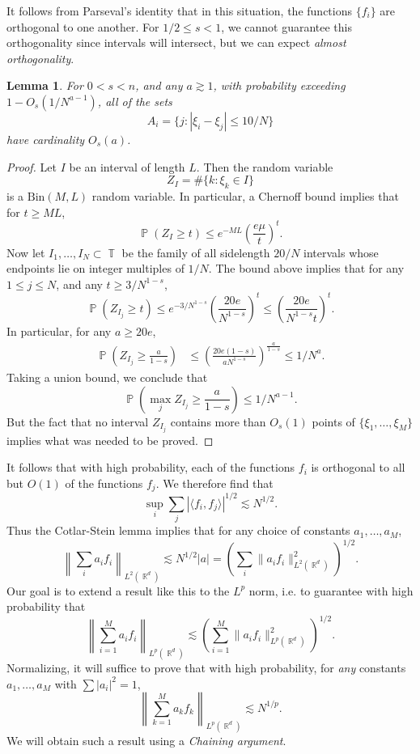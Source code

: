 \documentclass[dvipsnames,letterpaper,12pt]{article}
\numberwithin{equation}{section}
\DeclareMathOperator{\RR}{\mathbb{R}}
\DeclareMathOperator{\TT}{\mathbb{T}}
\newtheorem{lemma}[theorem]{Lemma}
\numberwithin{theorem}{section}
\DeclareMathOperator{\PP}{\mathbb{P}}
\begin{document}
It follows from Parseval's identity that in this situation, the functions $\{ f_i \}$ are orthogonal to one another. For $1/2 \leq s < 1$, we cannot guarantee this orthogonality since intervals will intersect, but we can expect \emph{almost orthogonality}.

\begin{lemma}
    For $0 < s < n$, and any $a \gtrsim 1$, with probability exceeding $1 - O_s(1/N^{a-1})$, all of the sets
    \[ A_i = \{ j : |\xi_i - \xi_j| \leq 10/N \} \]
    have cardinality $O_s(a)$.
\end{lemma}
\begin{proof}
    Let $I$ be an interval of length $L$. Then the random variable
    \[ Z_I = \# \{ k: \xi_k \in I \} \]
    is a $\text{Bin}(M,L)$ random variable. In particular, a Chernoff bound implies that for $t \geq ML$,
    \[ \PP( Z_I \geq t ) \leq e^{-ML} \left( \frac{e \mu}{t} \right)^t. \]
    Now let $I_1,\dots,I_N \subset \TT$ be the family of all sidelength $20/N$ intervals whose endpoints lie on integer multiples of $1/N$. The bound above implies that for any $1 \leq j \leq N$, and any $t \geq 3/N^{1-s}$,
    \[ \PP( Z_{I_j} \geq t ) \leq e^{-3/N^{1-s}} \left( \frac{20e}{N^{1-s}} \right)^t \leq \left( \frac{20e}{N^{1-s} t} \right)^t. \]
    In particular, for any $a \geq 20e$,
    \begin{align*}
        \PP \left(Z_{I_j} \geq \frac{a}{1 - s} \right) &\leq \left( \frac{20e(1-s)}{a N^{1-s}} \right)^{\frac{a}{1-s}} \leq 1/N^a.
    \end{align*}
    Taking a union bound, we conclude that
    \[ \PP \left( \max_j Z_{I_j} \geq \frac{a}{1-s} \right) \leq 1/N^{a-1}. \]
    But the fact that no interval $Z_{I_j}$ contains more than $O_s(1)$ points of $\{ \xi_1,\dots, \xi_M \}$ implies what was needed to be proved.
\end{proof}

It follows that with high probability, each of the functions $f_i$ is orthogonal to all but $O(1)$ of the functions $f_j$. We therefore find that
%
\[ \sup_i \sum_j |\langle f_i, f_j \rangle|^{1/2} \lesssim N^{1/2}. \]
%
Thus the Cotlar-Stein lemma implies that for any choice of constants $a_1,\dots,a_M$,
%
\[ \left\| \sum_i a_i f_i \right\|_{L^2(\RR^d)} \lesssim N^{1/2} |a| = \left( \sum_i \| a_i f_i \|_{L^2(\RR^d)}^2 \right)^{1/2}. \]
%
Our goal is to extend a result like this to the $L^p$ norm, i.e. to guarantee with high probability that
%
\[ \left\| \sum_{i = 1}^M a_i f_i \right\|_{L^p(\RR^d)} \lesssim \left( \sum_{i = 1}^M \| a_i f_i \|_{L^p(\RR^d)}^2 \right)^{1/2}. \]
%
Normalizing, it will suffice to prove that with high probability, for \emph{any} constants $a_1,\dots,a_M$ with $\sum |a_i|^2 = 1$,
%
\[ \left\| \sum_{k = 1}^M a_k f_k \right\|_{L^p(\RR^d)} \lesssim N^{1/p}. \]
%
We will obtain such a result using a \emph{Chaining argument}. 
\end{document}
